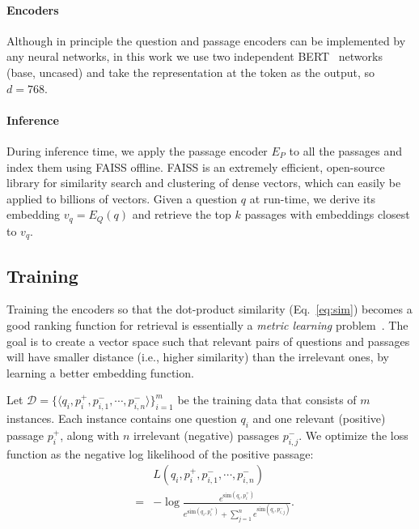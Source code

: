 \paragraph{Encoders}
Although in principle the question and passage encoders can be implemented by any neural networks, in this work we use two independent BERT~\cite{devlin2018bert} networks (base, uncased) and take the representation at the \ttt{[CLS]} token as the output, so $d = 768$.

\paragraph{Inference}
During inference time, we apply the passage encoder $E_P$ to all the passages and index them using FAISS \cite{johnson2017billion} offline.
FAISS is an extremely efficient, open-source library for similarity search and clustering of dense vectors, which can easily be applied to billions of vectors.
Given a question $q$ at run-time, we derive its embedding $v_q = E_Q(q)$ and retrieve the top $k$ passages with embeddings closest to $v_q$.


\subsection{Training}\label{sec:training}

Training the encoders so that the dot-product similarity (Eq.~\eqref{eq:sim}) becomes a good ranking function for retrieval is essentially a \emph{metric learning} problem~\cite{kulis2013metric}.
The goal is to create a vector space such that relevant pairs of questions and passages will have smaller distance (i.e., higher similarity) than the irrelevant ones, by learning a better embedding function.

Let $\mathcal{D} = \{ \langle q_i, p^+_i, p^-_{i,1}, \cdots, p^-_{i,n} \rangle \}_{i=1}^m$ be the training data that consists of $m$ instances.
Each instance contains one question $q_i$ and one relevant (positive) passage $p^+_i$, along with $n$ irrelevant (negative) passages $p^-_{i,j}$.
We optimize the loss function as the negative log likelihood of the positive passage:
\begin{eqnarray}
&& L(q_i, p^+_i, p^-_{i,1}, \cdots, p^-_{i,n}) \label{eq:training} \\
&=& -\log \frac{ e^{\mathrm{sim}(q_i, p_i^+)} }{e^{\mathrm{sim}(q_i, p_i^+)} + \sum_{j=1}^n{e^{\mathrm{sim}(q_i, p^-_{i,j})}}}. \nonumber
\end{eqnarray}

